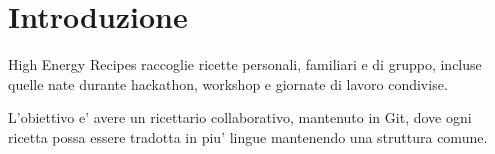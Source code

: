 \chapter*{Introduzione}

High Energy Recipes raccoglie ricette personali, familiari e di gruppo, incluse quelle nate durante hackathon, workshop e giornate di lavoro condivise.

L'obiettivo e' avere un ricettario collaborativo, mantenuto in Git, dove ogni ricetta possa essere tradotta in piu' lingue mantenendo una struttura comune.
